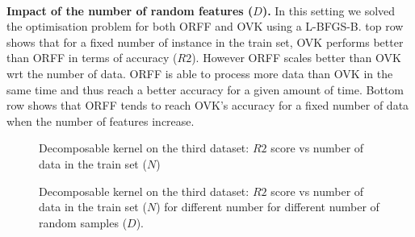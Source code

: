 \paragraph{}
\textbf{Impact of the number of random features ($D$).}
In this setting we solved the optimisation problem for both \acs{ORFF} and
\acs{OVK} using a \acs{L-BFGS-B}.  top row shows that
for a fixed number of instance in the train set, \acs{OVK} performs better than
\acs{ORFF} in terms of accuracy ($R2$). However \acs{ORFF} scales better than
\acs{OVK} \acs{wrt} the number of data. \acs{ORFF} is able to process more data
than \acs{OVK} in the same time and thus reach a better accuracy for a given
amount of time. Bottom row shows that \acs{ORFF} tends to reach \acs{OVK}'s
accuracy for a fixed number of data when the number of features increase.
\begin{figure}
    \centering
    \resizebox{\textwidth}{!}{%
    }
    \caption{Decomposable kernel on the third dataset: $R2$ score vs number of
    data in the train set ($N$) \label{fig:ORFFvsOVK_dec}}
\end{figure}
\begin{figure}
    \centering
    \resizebox{\textwidth}{!}{%
    }
    \caption{Decomposable kernel on the third dataset: $R2$ score vs number of
    data in the train set ($N$) for different number for different number of
    random samples ($D$). \label{fig:ORFFvsOVK}}
\end{figure}
